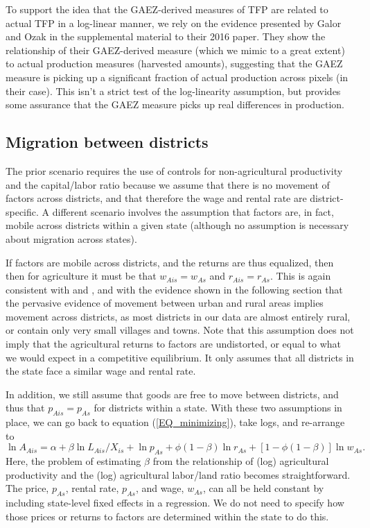 To support the idea that the GAEZ-derived measures of TFP are related to actual TFP in a log-linear manner, we rely on the evidence presented by Galor and Ozak in the supplemental material to their 2016 paper. They show the relationship of their GAEZ-derived measure (which we mimic to a great extent) to actual production measures (harvested amounts), suggesting that the GAEZ measure is picking up a significant fraction of actual production across pixels (in their case). This isn't a strict test of the log-linearity assumption, but provides some assurance that the GAEZ measure picks up real differences in production.
\subsection{Migration between districts}
The prior scenario requires the use of controls for non-agricultural productivity and the capital/labor ratio because we assume that there is no movement of factors across districts, and that therefore the wage and rental rate are district-specific. A different scenario involves the assumption that factors are, in fact, mobile across districts within a given state (although no assumption is necessary about migration across states).

If factors are mobile across districts, and the returns are thus equalized, then 
then for agriculture it must be that $w_{Ais} = w_{As}$ and $r_{Ais} = r_{As}$. This is again consistent with \citet{young2013inequality} and \citet{hklm2017}, and with the evidence shown in the following section that the pervasive evidence of movement between urban and rural areas implies movement across districts, as most districts in our data are almost entirely rural, or contain only very small villages and towns. Note that this assumption does not imply that the agricultural returns to factors are undistorted, or equal to what we would expect in a competitive equilibrium. It only assumes that all districts in the state face a similar wage and rental rate.

In addition, we still assume that goods are free to move between districts, and thus that $p_{Ais} = p_{As}$ for districts within a state. With these two assumptions in place, we can go back to equation (\ref{EQ_minimizing}), take logs, and re-arrange to
\begin{equation*}
	\ln A_{Ais} = \alpha + \beta \ln L_{Ais}/X_{is} + \ln p_{As} + \phi(1-\beta)\ln r_{As} + \left[1-\phi(1-\beta)\right] \ln w_{As}.
\end{equation*}
Here, the problem of estimating $\beta$ from the relationship of (log) agricultural productivity and the (log) agricultural labor/land ratio becomes straightforward. The price, $p_{As}$, rental rate, $p_{As}$, and wage, $w_{As}$, can all be held constant by including state-level fixed effects in a regression. We do not need to specify how those prices or returns to factors are determined within the state to do this.




